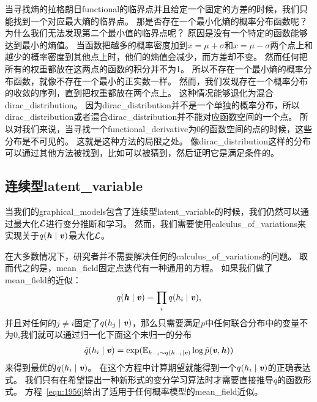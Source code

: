 当寻找熵的拉格朗日\gls{functional}的临界点并且给定一个固定的方差的时候，我们只能找到一个对应最大熵的临界点。
那是否存在一个最小化熵的概率分布函数呢？
为什么我们无法发现第二个最小值的临界点呢？
原因是没有一个特定的函数能够达到最小的熵值。
当函数把越多的概率密度加到$x = \mu + \sigma$和$x = \mu - \sigma$两个点上和越少的概率密度到其他点上时，他们的熵值会减少，而方差却不变。
然而任何把所有的权重都放在这两点的函数的积分并不为1。
所以不存在一个最小熵的概率分布函数，就像不存在一个最小的正实数一样。
然而，我们发现存在一个概率分布的收敛的序列，直到把权重都放在两个点上。
这种情况能够退化为混合\gls{dirac_distribution}。
因为\gls{dirac_distribution}并不是一个单独的概率分布，所以\gls{dirac_distribution}或者混合\gls{dirac_distribution}并不能对应函数空间的一个点。
所以对我们来说，当寻找一个\gls{functional_derivative}为0的函数空间的点的时候，这些分布是不可见的。
这就是这种方法的局限之处。
像\gls{dirac_distribution}这样的分布可以通过其他方法被找到，比如可以被猜到，然后证明它是满足条件的。



\subsection{连续型\gls{latent_variable}}
\label{sec:continuous_latent_variables}


当我们的\gls{graphical_models}包含了连续型\gls{latent_variable}的时候，我们仍然可以通过最大化$\mathcal{L}$进行变分推断和学习。
然而，我们需要使用\gls{calculus_of_variations}来实现关于$q(\boldsymbol{\mathit{h}}\mid\boldsymbol{\mathit{v}})$最大化$\mathcal{L}$。


在大多数情况下，研究者并不需要解决任何的\gls{calculus_of_variations}的问题。
取而代之的是，\gls{mean_field}固定点迭代有一种通用的方程。
如果我们做了\gls{mean_field}的近似：
\begin{align}
\label{eqn:1955}
	q(\boldsymbol{\mathit{h}}\mid\boldsymbol{\mathit{v}}) = \prod_i q(h_i \mid\boldsymbol{\mathit{v}}),
\end{align}
并且对任何的$j\neq i$固定了$q(h_j\mid\boldsymbol{\mathit{v}})$，那么只需要满足$p$中任何联合分布中的变量不为$0$,我们就可以通过归一化下面这个未归一的分布
\begin{align}
	\label{eqn:1956}
	\tilde{q}(h_i \mid\boldsymbol{\mathit{v}}) = \exp (\mathbb{E}_{h_{-i}\sim q(h_{-i}\mid\boldsymbol{\mathit{v}})}	\log \tilde{p}(\boldsymbol{\mathit{v}},\boldsymbol{\mathit{h}}))
\end{align}
来得到最优的$q(h_i\mid\boldsymbol{\mathit{v}})$。
在这个方程中计算期望就能得到一个$q(h_i\mid\boldsymbol{\mathit{v}})$的正确表达式。
我们只有在希望提出一种新形式的变分学习算法时才需要直接推导$q$的函数形式。
方程~\eqref{eqn:1956}给出了适用于任何概率模型的\gls{mean_field}近似。




